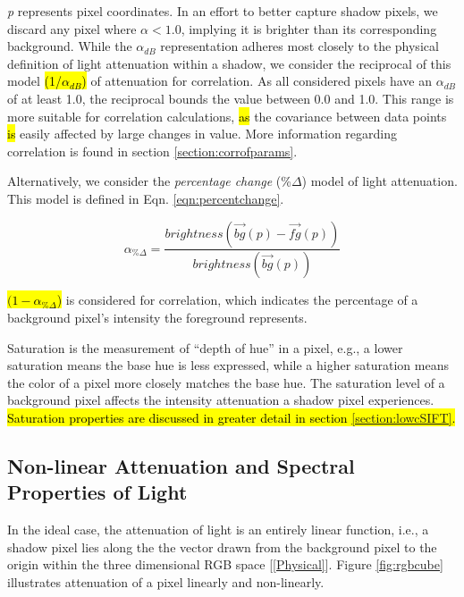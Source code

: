 \textit{p} represents pixel coordinates. In an effort to better capture shadow pixels, we discard any pixel where $\alpha < 1.0$, implying it is brighter than its corresponding background. While the $\alpha_{dB}$ representation adheres most closely to the physical definition of light attenuation within a shadow, we consider the reciprocal of this model \hl{(1/$\alpha_{dB}$)} of attenuation for correlation. As all considered pixels have an $\alpha_{dB}$ of at least 1.0, the reciprocal bounds the value between 0.0 and 1.0. This range is more suitable for correlation calculations, \hl{as} the covariance between data points \hl{is} easily affected by large changes in value. More information regarding correlation is found in section \ref{section:corrofparams}.

Alternatively, we consider the \textit{percentage change} (\%$\Delta$) model of light attenuation. This model is defined in Eqn. \ref{eqn:percentchange}.

\begin{equation}
\alpha_{\%\Delta} = \dfrac{brightness(\vec{bg}(p) - \vec{fg}(p))}{brightness(\vec{bg}(p))}
\label{eqn:percentchange}
\end{equation}

\hl{$(1 - \alpha_{\%\Delta}$)} is considered for correlation, which indicates the percentage of a background pixel's intensity the foreground represents.

Saturation is the measurement of ``depth of hue'' in a pixel, e.g., a lower saturation means the base hue is less expressed, while a higher saturation means the color of a pixel more closely matches the base hue. The saturation level of a background pixel affects the intensity attenuation a shadow pixel experiences. \hl{Saturation properties are discussed in greater detail in section \ref{section:lowcSIFT}.}

\subsection{Non-linear Attenuation and Spectral Properties of Light} \label{section:nonlinearatten}

In the ideal case, the attenuation of light is an entirely linear function, i.e., a shadow pixel lies along the the vector drawn from the background pixel to the origin within the three dimensional RGB space [\ref{Physical}]. Figure \ref{fig:rgbcube} illustrates attenuation of a pixel linearly and non-linearly.

